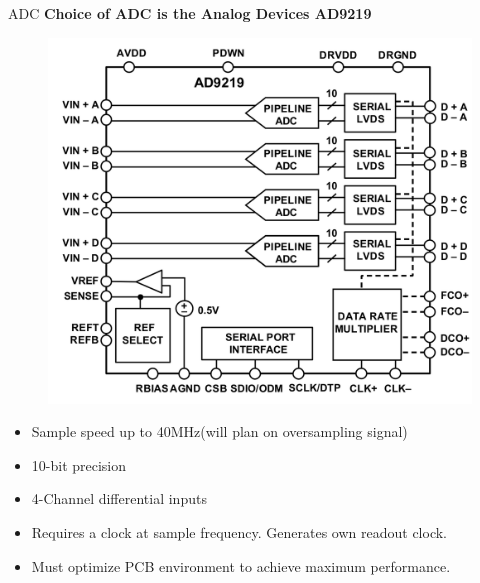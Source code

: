 \documentclass{beamer}
\begin{document}
\begin{frame}[shrink]{ADC}
  \centering
  \textbf{Choice of ADC is the Analog Devices AD9219}
  \begin{figure}
    \includegraphics[height=0.4\textheight]{figures/AD9219}
  \end{figure}
  \begin{itemize}
    \item Sample speed up to 40MHz(will plan on oversampling signal)
    \item 10-bit precision
    \item 4-Channel differential inputs
    \item Requires a clock at sample frequency. Generates own readout clock.
    \item Must optimize PCB environment to achieve maximum performance.
  \end{itemize}
\end{frame}
\end{document}
